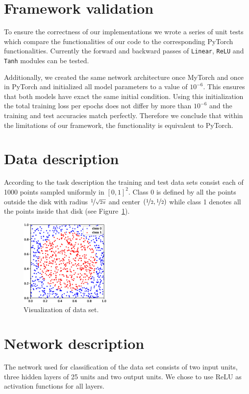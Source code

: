\documentclass[10pt,conference,compsocconf]{IEEEtran}
\begin{document}
\section{Framework validation}
To ensure the correctness of our implementations we wrote a series of unit tests which compare the functionalities of our code to the corresponding PyTorch functionalities. Currently the forward and backward passes of \texttt{Linear}, \texttt{ReLU} and \texttt{Tanh} modules can be tested.

Additionally, we created the same network architecture once MyTorch and once in PyTorch and initialized all model parameters to a value of $10^{-6}$. This ensures that both models have exact the same initial condition. Using this initialization the total training loss per epochs does not differ by more than $10^{-6}$ and the training and test accuracies match perfectly. Therefore we conclude that within the limitations of our framework, the functionality is equivalent to PyTorch.

\section{Data description}
According to the task description the training and test data sets consist each of 1000 points sampled uniformly in $[0,1]^2$. Class 0 is defined by all the points outside the disk with radius $\nicefrac{1}{\sqrt{2\pi}}$ and center $(\nicefrac{1}{2}, \nicefrac{1}{2})$ while class 1 denotes all the points inside that disk (see Figure~\ref{fig:data_set}).

\begin{figure}[h]
  \centering
  \includegraphics[width = 0.4\textwidth]{fig/disk_data_set.eps}
  \caption{Visualization of data set.}
  \label{fig:data_set}
\end{figure}


\section{Network description}
The network used for classification of the data set consists of two input units, three hidden layers of 25 units and two output units. We chose to use ReLU as activation functions for all layers.
\end{document}
